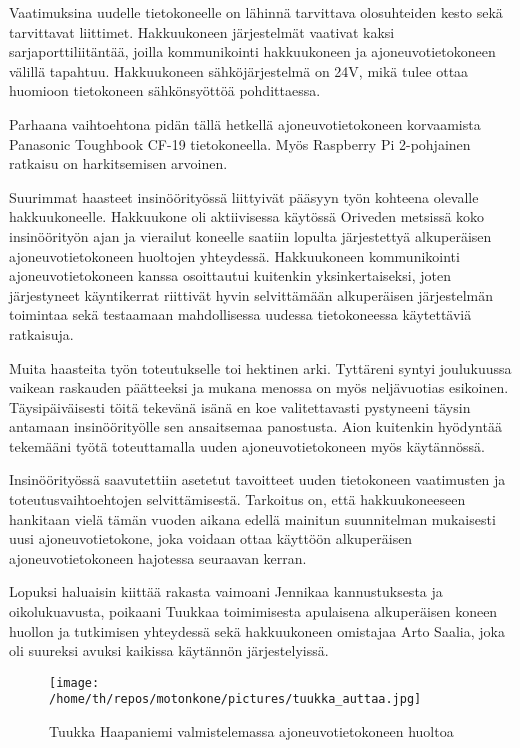 \documentclass[11pt,a4paper,oneside,article]{memoir}
\begin{document}
Vaatimuksina uudelle tietokoneelle on lähinnä tarvittava olosuhteiden kesto sekä tarvittavat liittimet. Hakkuukoneen järjestelmät vaativat kaksi sarjaporttiliitäntää, joilla kommunikointi hakkuukoneen ja ajoneuvotietokoneen välillä tapahtuu. Hakkuukoneen sähköjärjestelmä on 24V, mikä tulee ottaa huomioon tietokoneen sähkönsyöttöä pohdittaessa.

Parhaana vaihtoehtona pidän tällä hetkellä ajoneuvotietokoneen korvaamista Panasonic Toughbook CF-19 tietokoneella. Myös Raspberry Pi 2-pohjainen ratkaisu on harkitsemisen arvoinen.

Suurimmat haasteet insinöörityössä liittyivät pääsyyn työn kohteena olevalle hakkuukoneelle. Hakkuukone oli aktiivisessa käytössä Oriveden metsissä koko insinöörityön ajan ja vierailut koneelle saatiin lopulta järjestettyä alkuperäisen ajoneuvotietokoneen huoltojen yhteydessä. Hakkuukoneen kommunikointi ajoneuvotietokoneen kanssa osoittautui kuitenkin yksinkertaiseksi, joten järjestyneet käyntikerrat riittivät hyvin selvittämään alkuperäisen järjestelmän toimintaa sekä testaamaan mahdollisessa uudessa tietokoneessa käytettäviä ratkaisuja.

Muita haasteita työn toteutukselle toi hektinen arki. Tyttäreni syntyi joulukuussa vaikean raskauden päätteeksi ja mukana menossa on myös neljävuotias esikoinen. Täysipäiväisesti töitä tekevänä isänä en koe valitettavasti pystyneeni täysin antamaan insinöörityölle sen ansaitsemaa panostusta. Aion kuitenkin hyödyntää tekemääni työtä toteuttamalla uuden ajoneuvotietokoneen myös käytännössä.

Insinöörityössä saavutettiin asetetut tavoitteet uuden tietokoneen vaatimusten ja toteutusvaihtoehtojen selvittämisestä. Tarkoitus on, että hakkuukoneeseen hankitaan vielä tämän vuoden aikana edellä mainitun suunnitelman mukaisesti uusi ajoneuvotietokone, joka voidaan ottaa käyttöön alkuperäisen ajoneuvotietokoneen hajotessa seuraavan kerran.

Lopuksi haluaisin kiittää rakasta vaimoani Jennikaa kannustuksesta ja oikolukuavusta, poikaani Tuukkaa toimimisesta apulaisena alkuperäisen koneen huollon ja tutkimisen yhteydessä sekä hakkuukoneen omistajaa Arto Saalia, joka oli suureksi avuksi kaikissa käytännön järjestelyissä.\newline


\begin{figure}[H]
\centering
\texttt{[image: /home/th/repos/motonkone/pictures/tuukka\_auttaa.jpg]}
\caption{Tuukka Haapaniemi valmistelemassa ajoneuvotietokoneen huoltoa}
\end{figure}
\newpage
\end{document}
